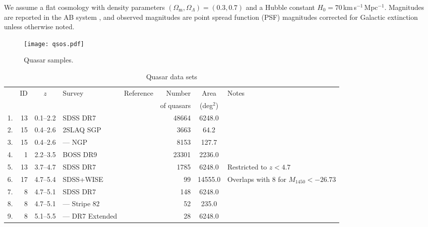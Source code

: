 \documentclass[a4paper,fleqn,usenatbib]{mnras}
\begin{document}
We assume a flat cosmology with density parameters
$\left(\Omega_\mathrm{m},\Omega_\Lambda\right)=\left(0.3,0.7\right)$
and a Hubble constant $H_0=70$\,km\,s$^{-1}$\,Mpc$^{-1}$. Magnitudes
are reported in the AB system \citep{1983ApJ...266..713O}, and
observed magnitudes are point spread function (PSF) magnitudes
\citep{2002AJ....123..485S} corrected for Galactic extinction
\citep{1998ApJ...500..525S} unless otherwise noted.

\begin{figure*}
  \begin{center}
    \texttt{[image: qsos.pdf]}
  \end{center}
  \caption{Quasar samples.}
  \label{fig:qsos}
\end{figure*}

\begin{table*}
  \caption{Quasar data sets}
  \label{tab:samples}
  \begin{tabular}{crcllrSl}
    \hline
    & ID & $z$ & Survey & Reference & Number & {Area} & Notes \\
    & & & & & of quasars & {(deg$^2$)} & \\
    . & 13 & 0.1--2.2 & SDSS DR7 & \citet{2006AJ....131.2766R} & 48664 & 6248.0 & \\
    2. & 15 & 0.4--2.6 & 2SLAQ SGP & \citet{2009MNRAS.392...19C} & 3663 & 64.2 & \\
    3. & 15  & 0.4--2.6 & --- NGP & \citet{2009MNRAS.392...19C} & 8153 & 127.7 & \\
    4. &  1 & 2.2--3.5 & BOSS DR9 & \citet{2013ApJ...773...14R} & 23301 & 2236.0 & \\
    5. & 13 & 3.7--4.7 & SDSS DR7 & \citet{2006AJ....131.2766R} & 1785 & 6248.0 & Restricted to $z<4.7$ \\
    6. & 17 & 4.7--5.4 & SDSS+WISE & \citet{2016ApJ...829...33Y} & 99 & 14555.0 & Overlaps with 8 for $M_{1450}<-26.73$ \\
    7. &  8 & 4.7--5.1 & SDSS DR7 & \citet{2013ApJ...768..105M} & 148 & 6248.0 & \\
    8. &  8 & 4.7--5.1 & --- Stripe 82 & \citet{2013ApJ...768..105M} & 52 & 235.0 & \\
    9. &  8 & 5.1--5.5 & --- DR7 Extended & \citet{2013ApJ...768..105M} & 28 & 6248.0 & \\

\end{tabular}
\end{table*}
\end{document}
